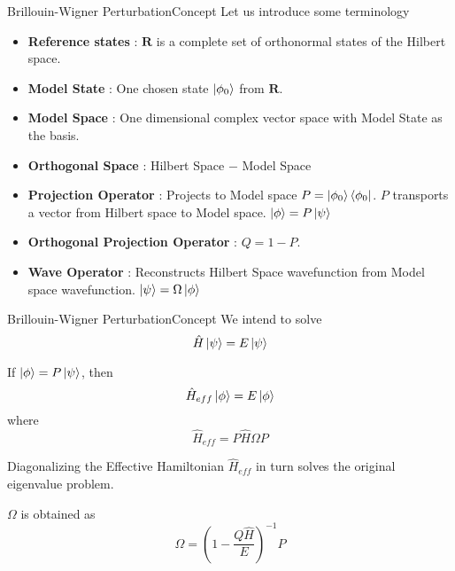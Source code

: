 \documentclass{beamer}
\begin{document}
\begin{frame}{Brillouin-Wigner Perturbation}{Concept}
Let us introduce some terminology \small
\begin{itemize}
 \item \textbf{Reference states} : $\mathbf{R}$ is a complete set of orthonormal states of the Hilbert space.
 \item \textbf{Model State} : One chosen state $\ket{\phi_0}$ from $\mathbf{R}$.
 \item \textbf{Model Space} : One dimensional complex vector space with Model State as the basis.
 \item \textbf{Orthogonal Space} : Hilbert Space $-$ Model Space
 \item \textbf{Projection Operator} : Projects to Model space $P = \ket{\phi_0}\bra{\phi_0}$. $P$ transports a vector from Hilbert space to Model space. $\ket{\phi} = P\ket{\psi}$ 
 \item \textbf{Orthogonal Projection Operator} : $Q = 1 - P$.
 \item \textbf{Wave Operator} : Reconstructs Hilbert Space wavefunction from Model space wavefunction. $\ket{\psi} = \Omega\ket{\phi}$ 
\end{itemize} \normalsize
\end{frame}

\begin{frame}{Brillouin-Wigner Perturbation}{Concept}
 We intend to solve
 \begin{equation*}
  \hat{H}\ket{\psi} = E\ket{\psi}
 \end{equation*}

 If $\ket{\phi} = P\ket{\psi}$, then
 \begin{equation}
  \hat{H}_{eff}\ket{\phi} = E\ket{\phi}
 \end{equation} where
 \begin{equation}
  \hat{H}_{eff} = P\hat{H}\Omega P
 \end{equation}
 
 Diagonalizing the Effective Hamiltonian $\hat{H}_{eff}$ in turn solves the original eigenvalue problem.
 
 $\Omega$ is obtained as
 \begin{equation}
    \Omega = \left(1-\frac{Q\hat{H}}{E}\right)^{-1}P
 \end{equation}
\end{frame}
\end{document}
